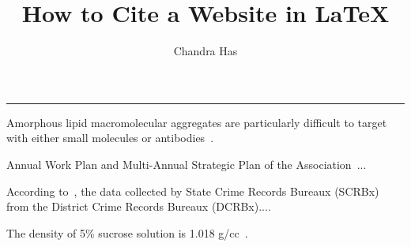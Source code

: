 \documentclass[12pt]{article}
\author{Chandra Has}\title{How to Cite a Website in \LaTeX}\date{}
\begin{document}
\maketitle\vskip-15pt\hrule\vskip15pt

Amorphous lipid macromolecular aggregates are particularly difficult to target with either small molecules or antibodies~\citep{Haussecker18}. 

Annual Work Plan and Multi-Annual Strategic Plan of the Association~\citep{ich18}... 

According to~\citet{ncrb15}, the data collected by State Crime Records Bureaux (SCRBx) from the District Crime Records Bureaux (DCRBx).... 

The density of 5\% sucrose solution is 1.018 g/cc~\citep{suc19}.  

  	
	
	
\end{document}
